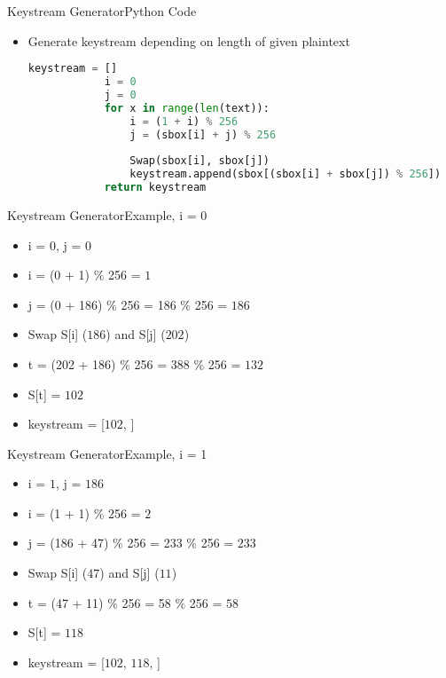\documentclass[
	aspectratio=169,	%
	onlytextwidth,		%
	t					%
	]{beamer}
\begin{document}
\begin{frame}[fragile]{Keystream Generator}{Python Code}
	\begin{itemize}
		\item Generate keystream depending on length of given plaintext
		\begin{lstlisting}[language=Python]
			keystream = []
			i = 0
			j = 0
			for x in range(len(text)):
				i = (1 + i) % 256
				j = (sbox[i] + j) % 256
				
				Swap(sbox[i], sbox[j])
				keystream.append(sbox[(sbox[i] + sbox[j]) % 256])    
			return keystream   
		\end{lstlisting}
	\end{itemize}
\end{frame}

\begin{frame}[fragile]{Keystream Generator}{Example, i = 0}
	\begin{itemize}
		\item i = $0$, j = $0$
		\item i = (0 + 1) $\%$ 256 = $1$
		\item j = (0 + 186) $\%$ 256 = 186 $\%$ 256 = $186$
		\item Swap S[i] ($186$) and S[j] ($202$)
		\item t = (202 + 186) $\%$ 256 = 388 $\%$ 256 = $132$
		\item S[t] = $102$
		\item keystream = [$102$, ]
	\end{itemize}
\end{frame}

\begin{frame}[fragile]{Keystream Generator}{Example, i = 1}
	\begin{itemize}
		\item i = $1$, j = $186$
		\item i = (1 + 1) $\%$ 256 = $2$
		\item j = (186 + 47) $\%$ 256 = 233 $\%$ 256 = $233$
		\item Swap S[i] ($47$) and S[j] ($11$)
		\item t = (47 + 11) $\%$ 256 = 58 $\%$ 256 = $58$
		\item S[t] = $118$
		\item keystream = [$102$, $118$, ]
	\end{itemize}
\end{frame}
\end{document}
